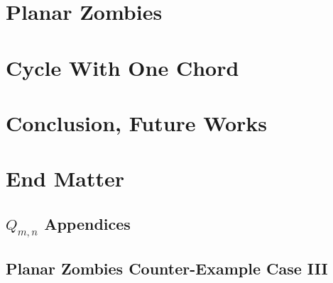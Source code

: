 \documentclass[letterpaper, 12pt]{report}
\theoremstyle{definition}
\begin{document}
\chapter{Planar Zombies \label{chapter planar zombies}}



%

%

\chapter{Cycle With One Chord \label{chapter q_m_n}}


\chapter{Conclusion, Future Works}


\newpage



\appendix

\chapter{End Matter}
\section{$Q_{m, n}$ Appendices}


\section{Planar Zombies Counter-Example Case III}
%
%
\end{document}
